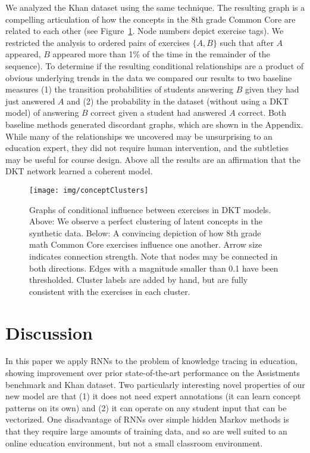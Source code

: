 \documentclass{article} \usepackage{nips,times}
\begin{document}
We analyzed the Khan dataset using the same technique. The resulting graph is a compelling articulation of how the concepts in the 8th grade Common Core are related to each other (see Figure~\ref{fig:conceptClusters}. Node numbers depict exercise tags).
We restricted the analysis to ordered pairs of exercises $\{A,B\}$ such that after $A$ appeared, $B$ appeared more than 1\% of the time in the remainder of the sequence).
To determine if the resulting conditional relationships are a product of obvious underlying trends in the data we compared our results to two baseline measures (1) the transition probabilities of students answering $B$ given they had just answered $A$ and (2) the probability in the dataset (without using a DKT model) of answering $B$ correct given a student had answered $A$ correct.
Both baseline methods generated discordant graphs, which are shown in the Appendix. While many of the relationships we uncovered may be unsurprising to an education expert, they did not require human intervention, and the subtleties may be useful for course design. Above all the results are an affirmation that the DKT network learned a coherent model.


\begin{figure}[t]
\centering
\texttt{[image: img/conceptClusters]}
\caption{Graphs of conditional influence between exercises in  DKT models. Above: We observe a perfect clustering of latent concepts in the synthetic data. Below: A convincing depiction of how 8th grade math Common Core exercises influence one another.
Arrow size indicates connection strength. Note that nodes may be connected in both directions. Edges with a magnitude smaller than 0.1 have been thresholded. Cluster labels are added by hand, but are fully consistent with the exercises in each cluster.
\label{fig:conceptClusters}
}
\vspace{-3mm}
\end{figure}


\section{Discussion}

In this paper we apply RNNs to the problem of knowledge tracing in education, showing improvement over prior state-of-the-art performance on the Assistments benchmark and Khan dataset.
Two particularly interesting novel properties of our new model are that (1) it does not need expert annotations (it can learn concept patterns on its own) and (2) it can operate on any student input that can be vectorized. One disadvantage of RNNs over simple hidden Markov methods is that they require large amounts of training data, and so are well suited to an online education environment, but not a small classroom environment. 
\end{document}
